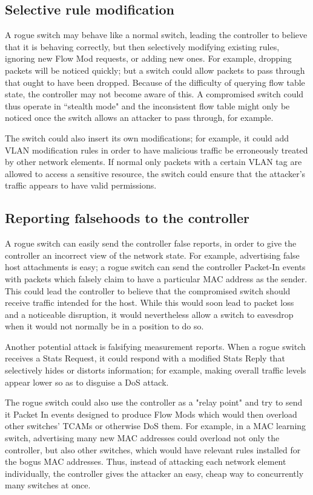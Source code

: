 \subsection{Selective rule modification}
A rogue switch may behave like a normal switch, leading the controller to believe that it is behaving correctly, but then selectively modifying existing rules, ignoring new Flow Mod requests, or adding new ones. For example, dropping packets will be noticed quickly; but a switch could allow packets to pass through that ought to have been dropped. Because of the difficulty of querying flow table state, the controller may not become aware of this. A compromised switch could thus operate in ``stealth mode" and the inconsistent flow table might only be noticed once the switch allows an attacker to pass through, for example.

The switch could also insert its own modifications; for example, it could add VLAN modification rules in order to have malicious traffic be erroneously treated by other network elements. If normal only packets with a certain VLAN tag are allowed to access a sensitive resource, the switch could ensure that the attacker's traffic appears to have valid permissions.

\subsection{Reporting falsehoods to the controller}

A rogue switch can easily send the controller false reports, in order to give the controller an incorrect view of the network state. For example, advertising false host attachments is easy; a rogue switch can send the controller Packet-In events with packets which falsely claim to have a particular MAC address as the sender. This could lead the controller to believe that the compromised switch should receive traffic intended for the host. While this would soon lead to packet loss and a noticeable disruption, it would nevertheless allow a switch to eavesdrop when it would not normally be in a position to do so.

Another potential attack is falsifying measurement reports. When a rogue switch receives a Stats Request, it could respond with a modified Stats Reply that selectively hides or distorts information; for example, making overall traffic levels appear lower so as to disguise a DoS attack. 

The rogue switch could also use the controller as a "relay point" and try to send it Packet In events designed to produce Flow Mods which would then overload other switches' TCAMs or otherwise DoS them. For example, in a MAC learning switch, advertising many new MAC addresses could overload not only the controller, but also other switches, which would have relevant rules installed for the bogus MAC addresses. Thus, instead of attacking each network element individually, the controller gives the attacker an easy, cheap way to concurrently many switches at once. 

